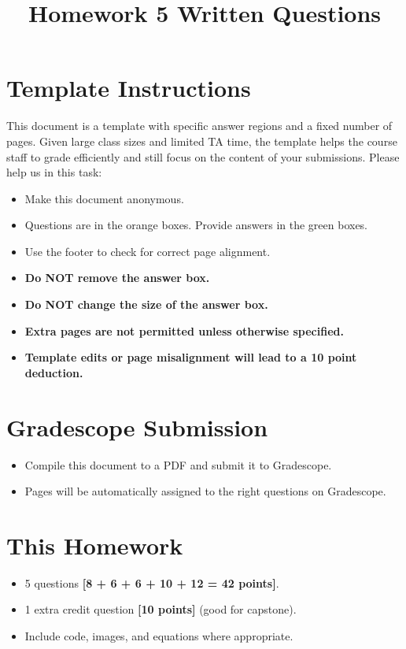 \date{}

\title{Homework 5 Written Questions}



\maketitle
\thispagestyle{fancy}

\section*{Template Instructions}

This document is a template with specific answer regions and a fixed number of pages. Given large class sizes and limited TA time, the template helps the course staff to grade efficiently and still focus on the content of your submissions. Please help us in this task:
 
\begin{itemize}
  \item Make this document anonymous.
  
  \item Questions are in the orange boxes. Provide answers in the green boxes.
  \item Use the footer to check for correct page alignment.

  \item \textbf{Do NOT remove the answer box.}
  \item \textbf{Do NOT change the size of the answer box.}
  \item \textbf{Extra pages are not permitted unless otherwise specified.}
  \item \textbf{Template edits or page misalignment will lead to a 10 point deduction.}
\end{itemize}

\section*{Gradescope Submission}
\begin{itemize}
  \item Compile this document to a PDF and submit it to Gradescope.
  \item Pages will be automatically assigned to the right questions on Gradescope.
\end{itemize}

\section*{This Homework}
\begin{itemize}
    \item 5 questions \textbf{[8 + 6 + 6 + 10 + 12 = 42 points]}.
    \item 1 extra credit question \textbf{[10 points]} (good for capstone).
    \item Include code, images, and equations where appropriate.
\end{itemize}

